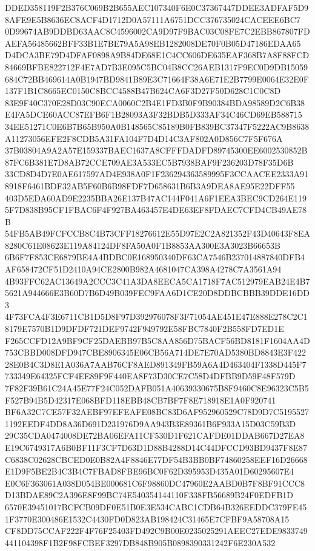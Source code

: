 \documentclass[UTF8,fontset=fandol,zihao=-4,a4paper]{ctexart}
\begin{document}
{{DDED358119F2B376C069B2B655AEC107340F6E0C37367447DDEE3ADFAF5D98AFE9E5B8636EC8ACF4D1712D0A57111A6751DCC376735024CACEEE6BC7
0D99674AB9DDBD63AAC8C4596002CA9D97F9BAC03C08FE7C2EBB867807FDAEFA56485662BFF33B1E7BE79A5A98EB1282008DE70F0B05D47186EDAA65
D4DCA3BE79D4DFAF0898A9B84DE68E1C4CC606DE635EAF368B7A8F88FCD84669BFBE822712F4E7AD7B3E095C5BC04B8CC26AEB1317F9EC0D9DB15059
684C72BB469614A0B1947BD9841B89E3C71664F38A6E71E2B7799E0064E32E0F137F1B1C8665EC0150C8BCC4588B47B624CA6F3D27F50D628C1C0C8D
83E9F40C370E28D03C90ECA0060C2B4E1FD3B0F9B90384BDA98589D2C6B38E4FA5DCE60ACC87EFB6F1B28093A3F32BDB5D333AF34C46CD69EB588715
34EE51271C0E6B7B65B950A0B148565C85189B0FB839BC37347F5222AC9B8638A11273056EFE2F8CDB5A31FA104F7D4D14C3AF802A0D856C7F5F676A
37B03804A9A2A57E159337BAEC1637A8CFFFDADFD89745300EE6002530852B87FC6B381E7D8AB72CCE709AE3A533EC5B7938BAF9F236203D78F35D6B
33CD8D4D7E0AE617597AD4E938A0F1F236294363589995F3CCAACEE2333A918918F6461BDF32AB5F60B6B98FDF7D658631B6B3A9DEA8AE95E22DFF55
403D5EDA60AD9E2235BBA26E137B47AC144F041A6F1EEA3BEC9CD264E1195F7D838B95CF1FBAC6F4F927BA463457E4DE63EF8FDAEC7CFD4CB49AE78B
54FB5AB49FCFCCB8C4B73CFF18276612E55D97E2C2A821352F43D40643F8EA8280C61E08623E119A84124DF8FA50A0F1B8853AA300E3A3023B66653B
6B6F7F853CE6879BE4A4BDBC0E168950340DF63CA7546B237014887840DFB4AF658472CF51D2410A94CE2800B982A4681047CA398A4278C7A3561A94
4B93FFC62AC13649A2CCC3C41A3DA8EECA5CA1718F7AC512979EAB24E4B75621A944666E3B60D7B6D49B039FEC9FAA6D1CE20D8DDBCBBB39DDE16DD3
4F73FCA4F3E6711CB1D5D8F97D392976078F3F71054AE451E47E888E278C2C18179E7570B1D9DFDF721DEF9742F949792E58FBC7840F2B558FD7ED1E
F265CCFD12A9BF9CF25DAEBB97B5C8AA856D75BACF56BD8181F1604AA4D753CBBD008DFD947CBE8906345E06CB56A714DE7E70AD5380BD8843E3F422
28E0B4C3D8E1A036A7AAB76CF8AED891349FB59A6A4D463404F1338D445F7733349E64325FCF4EE89F9F440EA8F73D30CE7C58D4DFBB9D59F48F579D
7F82F39B61C24A45E77F24C052DAFB051A40639330675B8F9460C8E96323C5B5F527B94B5D42317E068BFD118EBB48CB7BF7F8E718918E1A0F920741
BF6A32C7CE57F32AEBF97EFEAFE08BC83D6AF952960529C78D9D7C51955271192EEDF4DD8A36D691D231976D9AA943B3E89361B6F933A15D03C59B3D
29C35CDA0474008DE72BA06EFA11CF530D1F621CAFDE01DDAB667D27EA8E19C6749317A6B0BF11F3CF7D63D1D88B4288D14C44DFCCD93BD9437F8E87
C6838C02628CBCED0E0B82A4F8846E77DF54B3BB0BF74860258EEF16D26668E1D9F5BE2B4C3B4C7FBAD8FBE96BC0F62D395953D435A01D60295607E4
E0C6F363061A038D054BE000681C6F98860DC47960E2AABD0B7F8BF91CCC8D13BDAE89C2A396E8F99BC74E540354144110F338FB56689B24F0EDFB1D
6570E39451017BCFCB09DF0E51B0E3E534CABC1CDB64B326EEDDC379FE451F3770E300486E1532C4430FD0D823AB198424C31465E7CFBF9A58708A15
CF8DD75CCAF222F4F76F25403FD492C9B00E0235025291AEEC27EDE9833749441104398F1B2F98FCBEF3297DB848B905B0898390331242F6E230A532
}}
\end{document}
